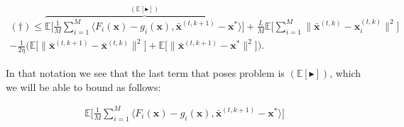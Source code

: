 \begin{align*}
    (\dagger) \leq \overbrace{\mathbb{E} \Bigg[ \frac{1}{M} \sum_{i=1}^M  \langle F_i(\bm{x}) - g_i(\bm{x})  ,\bar{\bm{x}}^{(t,k+1)} - \bm{x}^{*} \rangle    \Bigg] }^{(\mathbb{E}[\blacktriangleright])}
    + \frac{L}{M}  \mathbb{E} \Bigg[ \sum_{i=1}^M \|\bar{\bm{x}}^{(t,k)}-\bm{x}_i^{(t,k)} \|^2 \Bigg] \\ -  \frac{1}{2\eta} \Bigg( \mathbb{E} \Big[  \|  \bar{\bm{x}}^{(t,k+1)} - \bar{\bm{x}}^{(t,k)} \|^2 \Big] 
    + \mathbb{E} \Big[  \| \bar{\bm{x}}^{(t,k+1)} - \bm{x}^{*} \|^2  \Big] \Bigg).
\end{align*}

In that notation we see that the last term that poses problem is $(\mathbb{E}[\blacktriangleright])$, which we will be able to bound as follows:

\begin{align*}
    \mathbb{E} \Bigg[ \frac{1}{M} \sum_{i=1}^M  \langle F_i(\bm{x}) - g_i(\bm{x})  ,\bar{\bm{x}}^{(t,k+1)} - \bm{x}^{*} \rangle \Bigg] 
\end{align*}